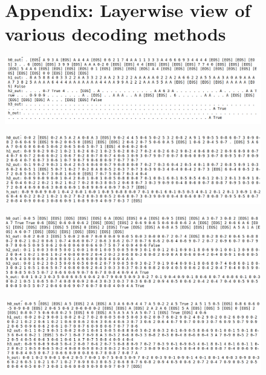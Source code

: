 \documentclass[10pt,a4paper]{article}
\begin{document}
\begin{figure}[p]
    \centering
    \section{Appendix: Layerwise view of various decoding methods}
    \vspace{-0.5em}  %
    
    \includegraphics[width=\textwidth,height=0.19\textheight,keepaspectratio]{greedy_decoding.png}
    \label{fig:greedy}
    
    \vspace{0.5em}
    
    \includegraphics[width=\textwidth,height=0.19\textheight,keepaspectratio]{rank2_decoding.png}
    \label{fig:rank2}
    
    \vspace{0.5em}
    
    \includegraphics[width=\textwidth,height=0.19\textheight,keepaspectratio]{our_method_decoding.png}
    \label{fig:our-method}
    
    \vspace{0.5em}
    
    \includegraphics[width=\textwidth,height=0.19\textheight,keepaspectratio]{random_tokens_decoding.png}
    \label{fig:random}
\end{figure}
\end{document}
